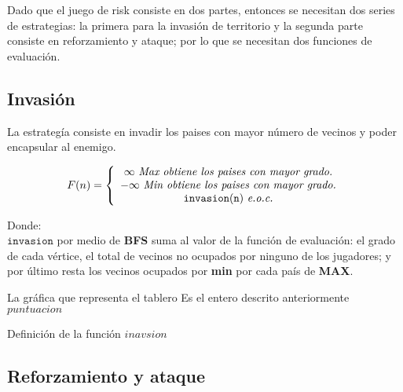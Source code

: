 \documentclass[12pt,twocolumn,draft]{article}
\begin{document}
Dado que el juego de risk consiste en dos partes, entonces se necesitan dos series de estrategias: la
primera para la invasi\'on de territorio y la segunda parte consiste en reforzamiento y ataque;
por lo que se necesitan dos funciones de evaluaci\'on.

\subsection{Invasi\'on}

La estrateg\'ia consiste en invadir los paises con mayor n\'umero de vecinos y poder encapsular al enemigo.

$$ 
F(n)= \left\{\begin{array}{c l}
  \infty\ \textit{Max\ obtiene\ los\ paises\ con\ mayor\ grado.}\\
  -\infty\ \textit{Min\ obtiene\ los\ paises\ con\ mayor\ grado.}\\
  \mathtt{invasion(n)}\ \textit{e.o.c.}
\end{array}
\right.
$$

Donde:\\

$\mathtt{invasion}$ por medio de \textbf{BFS} suma al valor de la funci\'on de evaluaci\'on: el
grado de cada v\'ertice, el total de vecinos no ocupados por ninguno de los jugadores; y por \'ultimo
resta los vecinos ocupados por \textbf{min} por cada pa\'is de \textbf{MAX}.\\

\begin{algorithm}
\begin{algorithmic}[1]
\REQUIRE La gr\'afica que representa el tablero
\ENSURE Es el entero descrito anteriormente
\ENDFOR
{}
\ENDIF
{}
\ENDIF
{}
\ENDIF
\ENDFOR
\ENDWHILE
\RETURN $puntuacion$
\end{algorithmic}
\caption{Definici\'on de la funci\'on $inavsion$}
\label{invasion}
\end{algorithm}

\subsection{Reforzamiento y ataque}
\end{document}
